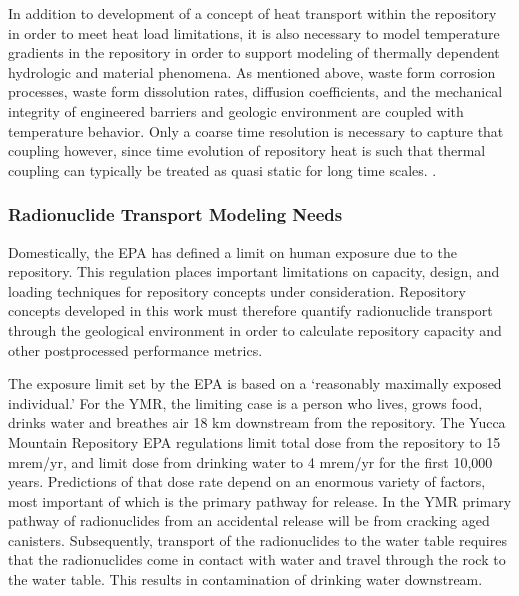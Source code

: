 
In addition to development of a concept of heat transport within the repository 
in order to meet heat load limitations, it is also necessary to model 
temperature gradients in the repository in  order to support modeling of 
thermally dependent hydrologic and material phenomena.  As mentioned above, 
waste form corrosion processes, waste form
dissolution rates, diffusion coefficients, and the mechanical integrity of 
engineered barriers and geologic environment are coupled with temperature 
behavior. 
Only a coarse time resolution is necessary to capture that coupling 
however, since time evolution of repository heat is
such that thermal coupling can typically be treated as quasi static for long 
time scales.
\cite{andra_argile:_2005}. %

\subsubsection{Radionuclide Transport Modeling Needs}

Domestically, the \gls{EPA} has defined a limit on  human 
exposure due to the repository. This regulation places important limitations on 
capacity, design, and loading techniques for repository concepts under 
consideration. Repository concepts developed in this work must therefore 
quantify radionuclide transport through the geological environment in order to 
calculate repository capacity and other postprocessed performance metrics. 

The exposure limit set by the \gls{EPA} is based on a `reasonably maximally 
exposed individual.' For the \gls{YMR}, the limiting case is a person who lives, 
grows food, drinks water and breathes air 18 km downstream from the repository. 
The Yucca Mountain Repository \gls{EPA} regulations limit total dose from the 
repository to 15 mrem/yr, and limit dose from drinking water to 4 mrem/yr for 
the first 10,000 years. 
Predictions of that dose rate depend on an enormous variety of factors, most 
important of which is the primary pathway for release. In the \gls{YMR} primary 
pathway of radionuclides from an accidental release will be from cracking aged 
canisters. Subsequently, transport of the radionuclides to the water table 
requires that the radionuclides come in contact with water and travel through 
the rock to the water table. This results in contamination of drinking water 
downstream.  

